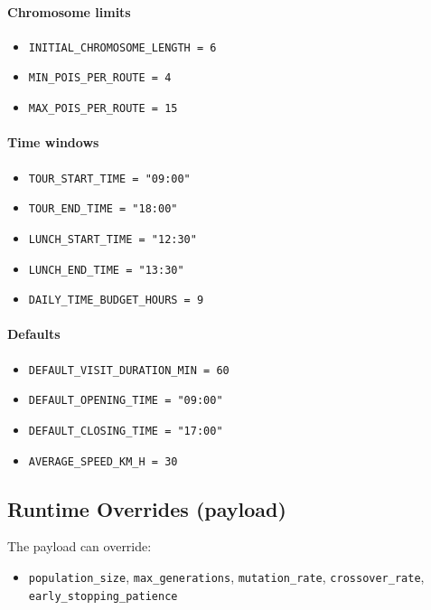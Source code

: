 \documentclass[11pt]{article}
\begin{document}
\paragraph{Chromosome limits}
\begin{itemize}
  \item \texttt{INITIAL\_CHROMOSOME\_LENGTH = 6}
  \item \texttt{MIN\_POIS\_PER\_ROUTE = 4}
  \item \texttt{MAX\_POIS\_PER\_ROUTE = 15}
\end{itemize}

\paragraph{Time windows}
\begin{itemize}
  \item \texttt{TOUR\_START\_TIME = "09:00"}
  \item \texttt{TOUR\_END\_TIME = "18:00"}
  \item \texttt{LUNCH\_START\_TIME = "12:30"}
  \item \texttt{LUNCH\_END\_TIME = "13:30"}
  \item \texttt{DAILY\_TIME\_BUDGET\_HOURS = 9}
\end{itemize}

\paragraph{Defaults}
\begin{itemize}
  \item \texttt{DEFAULT\_VISIT\_DURATION\_MIN = 60}
  \item \texttt{DEFAULT\_OPENING\_TIME = "09:00"}
  \item \texttt{DEFAULT\_CLOSING\_TIME = "17:00"}
  \item \texttt{AVERAGE\_SPEED\_KM\_H = 30}
\end{itemize}

\subsection{Runtime Overrides (payload)}
The payload can override:
\begin{itemize}
  \item \texttt{population\_size}, \texttt{max\_generations}, \texttt{mutation\_rate}, \texttt{crossover\_rate}, \texttt{early\_stopping\_patience}
\end{itemize}
\end{document}
